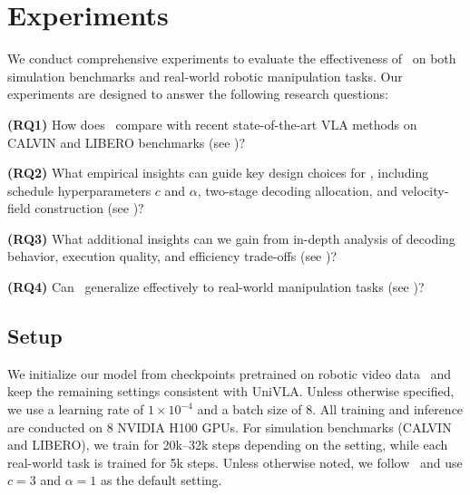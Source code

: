 \section{Experiments}
We conduct comprehensive experiments to evaluate the effectiveness of \method~on both simulation benchmarks and real-world robotic manipulation tasks.
Our experiments are designed to answer the following research questions:

\noindent
\textbf{(RQ1)} How does \method~compare with recent state-of-the-art VLA methods on CALVIN and LIBERO benchmarks (see )?



\noindent
\textbf{(RQ2)} What empirical insights can guide key design choices for \method, including schedule hyperparameters $c$ and $\alpha$, two-stage decoding allocation, and velocity-field construction (see )?

\noindent
\textbf{(RQ3)} What additional insights can we gain from in-depth analysis of decoding behavior, execution quality, and efficiency trade-offs (see )?

\noindent
\textbf{(RQ4)} Can \method~generalize effectively to real-world manipulation tasks (see )?


\subsection{Setup}


We initialize our model from checkpoints pretrained on robotic video data~\citep{univla} and keep the remaining settings consistent with UniVLA.
Unless otherwise specified, we use a learning rate of $1\times10^{-4}$ and a batch size of 8.
All training and inference are conducted on 8 NVIDIA H100 GPUs.
For simulation benchmarks (CALVIN and LIBERO), we train for 20k--32k steps depending on the setting, while each real-world task is trained for 5k steps.
Unless otherwise noted, we follow~\citep{luo2025next} and use $c=3$ and $\alpha=1$ as the default setting. 



